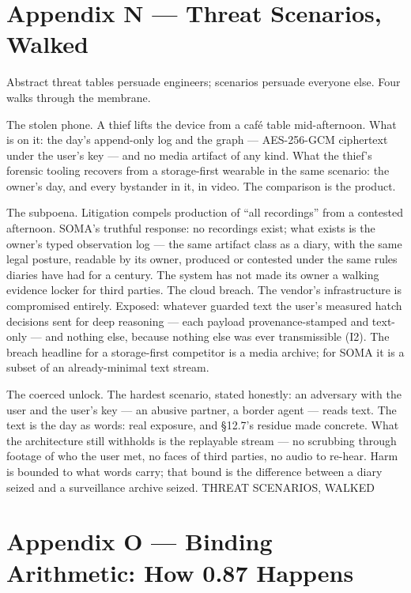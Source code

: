 \chapter*{Appendix N --- Threat Scenarios, Walked}\label{appendix-n-threat-scenarios-walked}

Abstract threat tables persuade engineers; scenarios persuade everyone else. Four walks through the membrane.

The stolen phone. A thief lifts the device from a café table mid-afternoon. What is on it: the day's append-only log and the graph --- AES-256-GCM ciphertext under the user's key --- and no media artifact of any kind. What the thief's forensic tooling recovers from a storage-first wearable in the same scenario: the owner's day, and every bystander in it, in video. The comparison is the product.

The subpoena. Litigation compels production of ``all recordings'' from a contested afternoon. SOMA's truthful response: no recordings exist; what exists is the owner's typed observation log --- the same artifact class as a diary, with the same legal posture, readable by its owner, produced or contested under the same rules diaries have had for a century. The system has not made its owner a walking evidence locker for third parties. The cloud breach. The vendor's infrastructure is compromised entirely. Exposed: whatever guarded text the user's measured hatch decisions sent for deep reasoning --- each payload provenance-stamped and text-only --- and nothing else, because nothing else was ever transmissible (I2). The breach headline for a storage-first competitor is a media archive; for SOMA it is a subset of an already-minimal text stream.

The coerced unlock. The hardest scenario, stated honestly: an adversary with the user and the user's key --- an abusive partner, a border agent --- reads text. The text is the day as words: real exposure, and \S{}12.7's residue made concrete. What the architecture still withholds is the replayable stream --- no scrubbing through footage of who the user met, no faces of third parties, no audio to re-hear. Harm is bounded to what words carry; that bound is the difference between a diary seized and a surveillance archive seized. THREAT SCENARIOS, WALKED

\chapter*{Appendix O --- Binding Arithmetic: How 0.87 Happens}\label{appendix-o-binding-arithmetic-how-0.87-happens}

